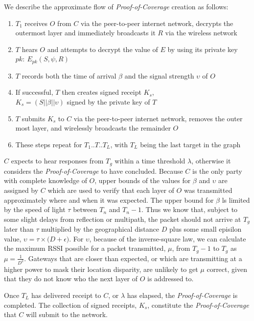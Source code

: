 \documentclass[10pt, nonatbib, nocopyrightspace, reprint]{sigplanconf}
\begin{document}
We describe the approximate flow of \emph{Proof-of-Coverage} creation as follows:

\begin{enumerate}
  \item $T_1$ receives $O$ from $C$ via the peer-to-peer internet network, decrypts the outermost layer and immediately broadcasts it $R$ via the wireless network
  \item $T$ hears $O$ and attempts to decrypt the value of $E$ by using its private key $pk:\ E_{pk}\left(S, \psi, R\right)$
  \item $T$ records both the time of arrival $\beta$ and the signal strength $\upsilon$ of $O$
  \item If successful, $T$ then creates signed receipt $K_s$, \\${K_s = \left(S || \beta || \upsilon\right)}$ signed by the private key of $T$
  \item $T$ submits $K_s$ to $C$ via the peer-to-peer internet network, removes the outer most layer, and wirelessly broadcasts the remainder $O$
  \item These steps repeat for $T_1$..$T$..$T_L$, with $T_L$ being the last target in the graph
\end{enumerate}

$C$ expects to hear responses from $T_g$ within a time threshold $\lambda$, otherwise it considers the \emph{Proof-of-Coverage} to have concluded. Because $C$ is the only party with complete knowledge of $O$, upper bounds of the values for $\beta$ and $\upsilon$ are assigned by $C$ which are used to verify that each layer of $O$ was transmitted approximately where and when it was expected. The upper bound for $\beta$ ls limited by the speed of light $\tau$ between $T_n$ and $T_n-1$. Thus we know that, subject to some slight delays from reflection or multipath, the packet should not arrive at $T_g$ later than $\tau$ multiplied by the geographical distance $D$ plus some small episilon value, $\upsilon = \tau \times \Big(D + \epsilon\Big)$. For $\upsilon$, because of the inverse-square law, we can calculate the maximum RSSI possible for a packet transmitted, $\mu$, from $T_g-1$ to $T_g$ as $\mu = \frac{1}{D^2}$. Gateways that are closer than expected, or which are transmitting at a higher power to mask their location disparity, are unlikely to get $\mu$ correct, given that they do not know who the next layer of $O$ is addressed to.

Once $T_L$ has delivered receipt to $C$, or $\lambda$ has elapsed, the \emph{Proof-of-Coverage} is completed. The collection of signed receipts, $K_s$, constitute the \emph{Proof-of-Coverage} that $C$ will submit to the network.
\end{document}
